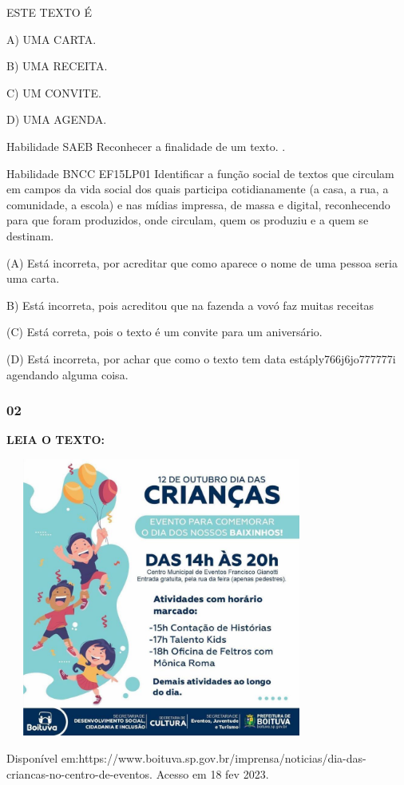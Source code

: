 \begin{escola}
ESTE TEXTO É

A) UMA CARTA.

B) UMA RECEITA.

C) UM CONVITE.

D) UMA AGENDA.

Habilidade SAEB Reconhecer a finalidade de um texto. .

Habilidade BNCC EF15LP01 Identificar a função social de textos que
circulam em campos da vida social dos quais participa cotidianamente (a
casa, a rua, a comunidade, a escola) e nas mídias impressa, de massa e
digital, reconhecendo para que foram produzidos, onde circulam, quem os
produziu e a quem se destinam.

(A) Está incorreta, por acreditar que como aparece o nome de uma pessoa
seria uma carta.

B) Está incorreta, pois acreditou que na fazenda a vovó faz muitas
receitas

(C) Está correta, pois o texto é um convite para um aniversário.

(D) Está incorreta, por achar que como o texto tem data
estáply766j6jo777777i agendando alguma
coisa.\protect\hypertarget{_heading=h.gz9yp347w1lz}{}{}

\subsubsection{02 }\label{section-13}

\textbf{LEIA O TEXTO:}

\includegraphics[width=4.03663in,height=3.60910in]{media/image158.jpg}

Disponível
em:https://www.boituva.sp.gov.br/imprensa/noticias/dia-das-criancas-no-centro-de-eventos.
Acesso em 18 fev 2023.


\end{escola}
